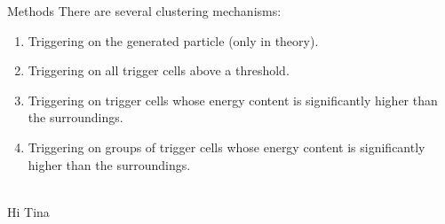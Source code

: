 \documentclass[final,hyperref={pdfpagelabels=false}]{beamer}
\begin{document}
\begin{frame}[t]
\begin{columns}[t]
\begin{column}{.465\textwidth}
\begin{block}{Methods}
	There are several clustering mechanisms:
	\begin{enumerate}
		\item Triggering on the generated particle (only in theory).
		\item Triggering on all trigger cells above a threshold.
		\item Triggering on trigger cells whose energy content is significantly higher than the surroundings.
		\item Triggering on groups of trigger cells whose energy content is significantly higher than the surroundings.
	\end{enumerate}
	
	\\
	Hi Tina \\
	

\end{block}


%
%
%
%


\end{column}
\end{columns}
\end{frame}
\end{document}
